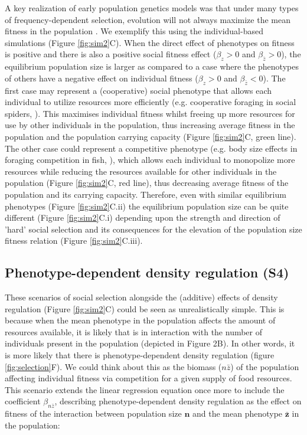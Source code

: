 \documentclass{article}
\begin{document}
A key realization of early population genetics models was that under many types of frequency-dependent selection, evolution will not always maximize the mean fitness in the population \citep{Fisher1930, Wright1948}. We exemplify this using the individual-based simulations (Figure \ref{fig:sim2}C). When the direct effect of phenotypes on fitness is positive and there is also a positive social fitness effect ($\beta_{z}>0$ and $\beta_{\bar{z}}>0$), the equilibrium population size is larger as compared to a case where the phenotypes of others have a negative effect on individual fitness ($\beta_{z}>0$ and $\beta_{\bar{z}}<0$). The first case may represent a (cooperative) social phenotype that allows each individual to utilize resources more efficiently (e.g. cooperative foraging in social spiders, \cite{Majer2018}). This maximises individual fitness whilst freeing up more resources for use by other individuals in the population, thus increasing average fitness in the population and the population carrying capacity (Figure \ref{fig:sim2}C, green line). The other case could represent a competitive phenotype (e.g. body size effects in foraging competition in fish, \cite{Ward2006}), which allows each individual to monopolize more resources while reducing the resources available for other individuals in the population (Figure \ref{fig:sim2}C, red line), thus decreasing average fitness of the population and its carrying capacity. Therefore, even with similar equilibrium phenotypes (Figure \ref{fig:sim2}C.ii) the equilibrium population size can be quite different (Figure \ref{fig:sim2}C.i) depending upon the strength and direction of 'hard' social selection and its consequences for the elevation of the population size fitness relation (Figure \ref{fig:sim2}C.iii). 

\subsection{Phenotype-dependent density regulation (S4)}
These scenarios of social selection alongside the (additive) effects of density regulation (Figure \ref{fig:sim2}C) could be seen as unrealistically simple. This is because when the mean phenotype in the population affects the amount of resources available, it is likely that is in interaction with the number of individuals present in the population (depicted in Figure 2B). In other words, it is more likely that there is phenotype-dependent density regulation (figure \ref{fig:selection}F). We could think about this as the biomass (${n\bar{z}}$) of the population affecting individual fitness via competition for a given supply of food resources. This scenario extends the linear regression equation once more to include the coefficient $\beta_{n \bar{z}}$, describing phenotype-dependent density regulation as the effect on fitness of the interaction between population size $\bm{n}$ and the mean phenotype $\bar{\bm{z}}$ in the population: 
\end{document}
